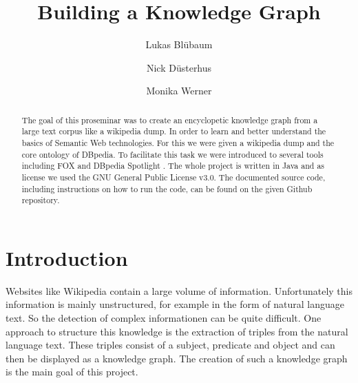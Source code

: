\documentclass[runningheads]{llncs}
\begin{document}
%
\title{Building a Knowledge Graph}
%
%

\author{Lukas Bl{\"u}baum \and Nick D{\"u}sterhus \and Monika Werner}
%
%
%
\maketitle              %
%
\begin{abstract}
The goal of this proseminar was to create an encyclopetic knowledge graph from a large text corpus like a wikipedia dump. In order to learn and better understand the basics of Semantic Web technologies. For this we were given a wikipedia dump and the core ontology of DBpedia. To facilitate this task we were introduced to several tools including FOX \cite{fox} and DBpedia Spotlight \cite{spotlight}. The whole project is written in Java and as license we used the GNU General Public License v3.0. The documented source code, including instructions on how to run the code, can be found on the given Github repository.

\end{abstract}


\section{Introduction}
Websites like Wikipedia contain a large volume of information. Unfortunately this information is mainly unstructured, for example in the form of natural language text. So the detection of complex informationen can be quite difficult. One approach to structure this knowledge is the extraction of triples from the natural language text. These triples consist of a subject, predicate and object and can then be displayed as a knowledge graph. The creation of such a knowledge graph is the main goal of this project. \\
\end{document}
